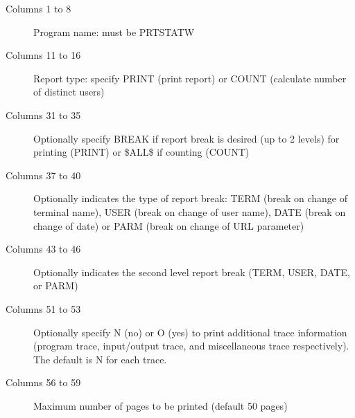 \documentclass[letterpaper,10pt,english]{sphinxmanual}
\begin{document}
\begin{description}
\item[{Columns 1 to 8}] \leavevmode
Program name: must be PRTSTATW

\item[{Columns 11 to 16}] \leavevmode
Report type: specify PRINT (print report) or COUNT (calculate number of distinct users)

\item[{Columns 31 to 35}] \leavevmode
Optionally specify BREAK if report break is desired (up to 2 levels) for printing (PRINT) or \$ALL\$ if counting (COUNT)

\item[{Columns 37 to 40}] \leavevmode
Optionally indicates the type of report break: TERM (break on change of terminal name), USER (break on change of user name), DATE (break on change of date) or PARM (break on change of URL parameter)

\item[{Columns 43 to 46}] \leavevmode
Optionally indicates the second level report break (TERM, USER, DATE, or PARM)

\item[{Columns 51 to 53}] \leavevmode
Optionally specify N (no) or O (yes) to print additional trace information (program trace, input/output trace, and miscellaneous trace respectively). The default is N for each trace.

\item[{Columns 56 to 59}] \leavevmode
Maximum number of pages to be printed (default 50 pages)

\end{description}

\begin{sphinxVerbatim}[commandchars=\\\{\}]
  
                                                      
     
            
                     
             
           
               
\end{sphinxVerbatim}
\end{document}
